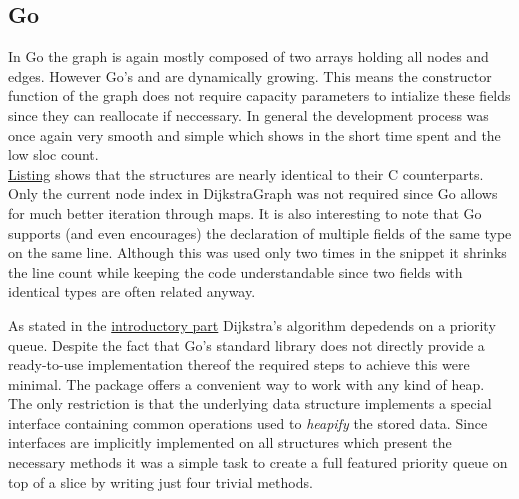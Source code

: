 \subsection{Go}
\label{subsec:Implementation::Graph_Representation::Go}

In Go the graph is again mostly composed of two arrays holding all nodes and edges. However Go's  and  are dynamically growing. This means the constructor function of the graph does not require capacity parameters to intialize these fields since they can reallocate if neccessary. In general the development process was once again very smooth and simple which shows in the short time spent and the low \gls{sloc} count.
\\


\hyperref[lst:graph_representation.go]{Listing} shows that the structures are nearly identical to their C counterparts. Only the current node index in DijkstraGraph was not required since Go allows for much better iteration through maps. It is also interesting to note that Go supports (and even encourages) the declaration of multiple fields of the same type on the same line. Although this was used only two times in the snippet it shrinks the line count while keeping the code understandable since two fields with identical types are often related anyway.

As stated in the \hyperref[sec:Implementation::Graph_Representation]{introductory part} Dijkstra's algorithm depedends on a priority queue. Despite the fact that Go's standard library does not directly provide a ready-to-use implementation thereof the required steps to achieve this were minimal. The package  offers a convenient way to work with any kind of heap. The only restriction is that the underlying data structure implements a special interface containing common operations used to \textit{heapify} the stored data. Since interfaces are implicitly implemented on all structures which present the necessary methods it was a simple task to create a full featured priority queue on top of a slice by writing just four trivial methods.
\\


